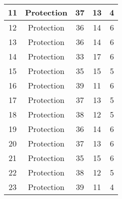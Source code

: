 \documentclass[results.tex]{subfiles}
\begin{document}
\begin{center}
\begin{tabular}{| c || c | c | c | c |}
            \hline
            11                      & Protection                   & 37                     & 13                      & 4                    \\
            \hline
            12                      & Protection                   & 36                     & 14                      & 6                    \\
            \hline
            13                      & Protection                   & 36                     & 14                      & 6                    \\
            \hline
            14                      & Protection                   & 33                     & 17                      & 6                    \\
            \hline
            15                      & Protection                   & 35                     & 15                      & 5                    \\
            \hline
            16                      & Protection                   & 39                     & 11                      & 6                    \\
            \hline
            17                      & Protection                   & 37                     & 13                      & 5                    \\
            \hline
            18                      & Protection                   & 38                     & 12                      & 5                    \\
            \hline
            19                      & Protection                   & 36                     & 14                      & 6                    \\
            \hline
            20                      & Protection                   & 37                     & 13                      & 6                    \\
            \hline
            21                      & Protection                   & 35                     & 15                      & 6                    \\
            \hline
            22                      & Protection                   & 38                     & 12                      & 5                    \\
            \hline
            23                      & Protection                   & 39                     & 11                      & 4                    \\

\end{tabular}
\end{center}
\end{document}
